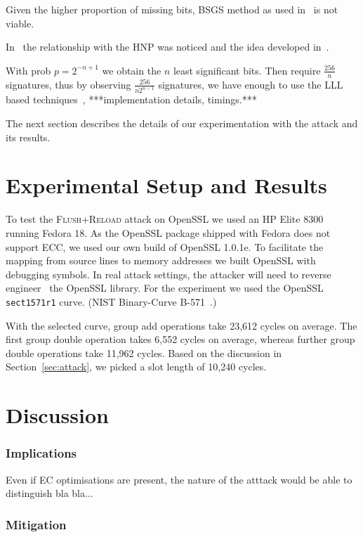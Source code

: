 \documentclass[twocolumn]{article}
\newcommand{\fl}{\textsc{Flu\-sh+\allowbreak Re\-load}\xspace}
\newcommand{\myupcase}[1]{\uppercase{#1}}
\begin{document}
Given the higher proportion of missing bits, BSGS method as used in~\cite{yarom_benger} is not viable. 

In~\cite{Howgrave-GrahamS01} the relationship with the HNP was noticed and the idea developed in~\cite{nguyen03insecurity}.


With prob $p=2^{-n+1}$ we obtain the $n$ least significant bits. Then require $\frac{256}{n}$ signatures, thus by observing $\frac{256}{n2^{n-1}}$ signatures, we have enough to use the LLL based techniques~\cite{nguyen03insecurity}, ***implementation details, timings.***



The next section describes the details of our experimentation with the attack and its results.

\section{Experimental Setup and Results}\label{sec:results}

To test the \fl attack on OpenSSL we used an HP Elite 8300 running Fedora 18. As the OpenSSL package shipped with Fedora does not support \myupcase{ecc},
we used our own build of OpenSSL 1.0.1e. To facilitate the mapping from source lines to memory addresses we built OpenSSL with debugging symbols.
In real attack settings, the attacker will need to reverse engineer~\cite{cipsero10software} the OpenSSL library. For the experiment we used the OpenSSL \texttt{sect1571r1} curve. (NIST Binary-Curve B-571~\cite{fips}.)

With the selected curve, group add operations take 23,612 cycles on average. The first group double operation takes 6,552 cycles on average, whereas further group double operations take 11,962 cycles. Based on the discussion in Section~\ref{sec:attack}, we picked a slot length of 10,240 cycles.




\section{Discussion}\label{sec:discussion}


\subsubsection*{Implications}
Even if EC optimisations are present, the nature of the atttack would be able to distinguish bla bla... 


\subsubsection*{Mitigation}
\end{document}
